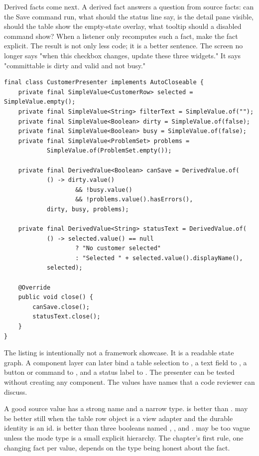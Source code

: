 Derived facts come next. A derived fact answers a question from source facts:
can the Save command run, what should the status line say, is the detail pane
visible, should the table show the empty-state overlay, what tooltip should a
disabled command show? When a listener only recomputes such a fact, make the
fact explicit. The result is not only less code; it is a better sentence. The
screen no longer says "when this checkbox changes, update these three widgets."
It says "committable is dirty and valid and not busy."

\begin{lstlisting}[caption={One presenter value graph in ordinary Java.}]
final class CustomerPresenter implements AutoCloseable {
    private final SimpleValue<CustomerRow> selected = SimpleValue.empty();
    private final SimpleValue<String> filterText = SimpleValue.of("");
    private final SimpleValue<Boolean> dirty = SimpleValue.of(false);
    private final SimpleValue<Boolean> busy = SimpleValue.of(false);
    private final SimpleValue<ProblemSet> problems =
            SimpleValue.of(ProblemSet.empty());

    private final DerivedValue<Boolean> canSave = DerivedValue.of(
            () -> dirty.value()
                    && !busy.value()
                    && !problems.value().hasErrors(),
            dirty, busy, problems);

    private final DerivedValue<String> statusText = DerivedValue.of(
            () -> selected.value() == null
                    ? "No customer selected"
                    : "Selected " + selected.value().displayName(),
            selected);

    @Override
    public void close() {
        canSave.close();
        statusText.close();
    }
}
\end{lstlisting}

The listing is intentionally not a framework showcase. It is a readable state
graph. A component layer can later bind a table selection to , a
text field to , a button or command to , and a
status label to . The presenter can be tested without creating
any component. The values have names that a code reviewer can discuss.

A good source value has a strong name and a narrow type. 
is better than .  may be better still when
the table row object is a view adapter and the durable identity is an id.
 is better than three booleans named ,
, and .  may be too vague unless the
mode type is a small explicit hierarchy. The chapter's first rule, one changing
fact per value, depends on the type being honest about the fact.

